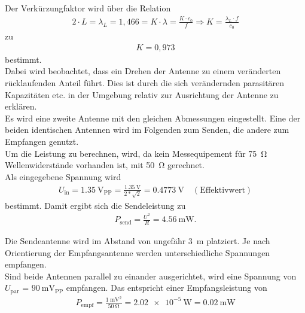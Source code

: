 \documentclass[a4paper,twoside,final]{article}
\begin{document}
Der Verkürzungfaktor wird über die Relation
\begin{align}
2\cdot L = \lambda_{L} = 1,466 = K \cdot \lambda = \frac{K\cdot c_0}{f} \Rightarrow K = \frac{\lambda_L \cdot f}{c_0}
\end{align}
zu
\begin{align}
K = 0,973
\end{align}
bestimmt.\\

Dabei wird beobachtet, dass ein Drehen der Antenne zu einem veränderten rücklaufenden Anteil führt. Dies ist durch die sich verändernden parasitären Kapazitäten etc. in der Umgebung relativ zur Ausrichtung der Antenne zu erklären.  \\
Es wird eine zweite Antenne mit den gleichen Abmessungen eingestellt. Eine der beiden identischen Antennen wird im Folgenden zum Senden, die andere zum Empfangen genutzt. \\
Um die Leistung zu berechnen, wird, da kein Messequipement für \SI{75}{\ohm} Wellenwiderstände vorhanden ist, mit \SI{50}{\ohm} gerechnet. \\
Als eingegebene Spannung wird
\begin{align}
U_\text{in} = \SI{1,35}{\volt_\text{PP}} = \frac{\SI{1,35}{\volt}}{2*\sqrt{2}} = \SI{0,4773}{\volt}\quad (\text{Effektivwert})
\end{align}
bestimmt. Damit ergibt sich die Sendeleistung zu
\begin{align}
P_\text{send} = \frac{U^2}{R} =  \SI{4,56}{\milli\watt}.
\end{align}

Die Sendeantenne wird im Abstand von ungefähr \SI{3}{\metre} platziert. Je nach Orientierung der Empfangsantenne werden unterschiedliche Spannungen empfangen. \\
Sind beide Antennen parallel zu einander ausgerichtet, wird eine Spannung von $U_\text{par}$ = $\SI{90}{\milli\volt_\text{PP}}$ empfangen. Das entspricht einer Empfangsleistung von
\begin{align}
P_\text{empf} =   \frac{\SI{1}{\milli\volt\squared}}{\SI{50}{\ohm}} = \SI{2,02e-5}{\watt} = \SI{0,02}{\milli\watt}
\end{align}
\end{document}
